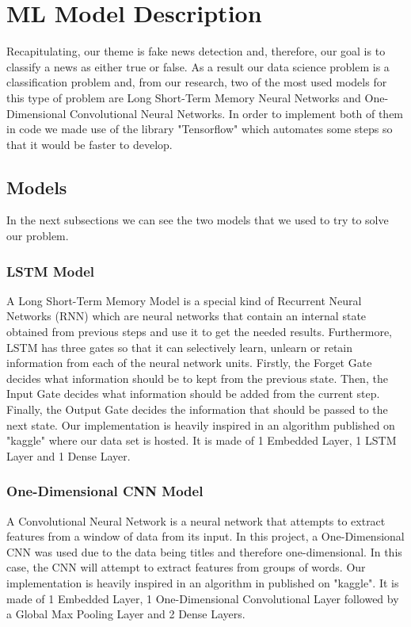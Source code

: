 \documentclass[conference]{IEEEtran}
\begin{document}
\section{ML Model Description}
Recapitulating, our theme is fake news detection and, therefore, our goal is to classify a news as either true or false. As a result our data science problem is a classification problem and, from our research, two of the most used models for this type of problem are Long Short-Term Memory Neural Networks and One-Dimensional Convolutional Neural Networks. In order to implement both of them in code we made use of the library "Tensorflow" which automates some steps so that it would be faster to develop.

\subsection{Models} In the next subsections we can see the two models that we used to try to solve our problem.

\subsubsection{LSTM Model \cite{U}}
A Long Short-Term Memory Model is a special kind of Recurrent Neural Networks (RNN) which are neural networks that contain an internal state obtained from previous steps and use it to get the needed results. Furthermore, LSTM has three gates so that it can selectively learn, unlearn or retain information from each of the neural network units. Firstly, the Forget Gate decides what information should be to kept from the previous state. Then, the Input Gate decides what information should be added from the current step. Finally, the Output Gate decides the information that should be passed to the next state. Our implementation is heavily inspired in an algorithm published on "kaggle"\cite{S} where our data set is hosted. It is made of 1 Embedded Layer, 1 LSTM Layer and 1 Dense Layer.

\subsubsection{One-Dimensional CNN Model}
A Convolutional Neural Network is a neural network that attempts to extract features from a window of data from its input. In this project, a One-Dimensional CNN was used due to the data being titles and therefore one-dimensional. In this case, the CNN will attempt to extract features from groups of words. Our implementation is heavily inspired in an algorithm in published on "kaggle"\cite{M}. It is made of 1 Embedded Layer, 1 One-Dimensional Convolutional Layer followed by a Global Max Pooling Layer and 2 Dense Layers.
\end{document}
